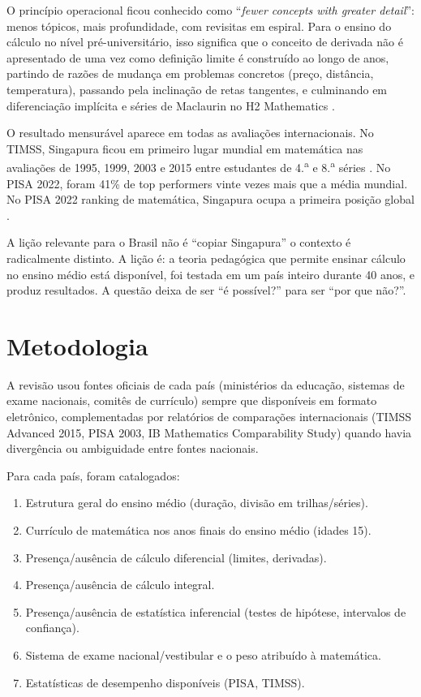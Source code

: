 \documentclass[12pt,a4paper,oneside]{article}
\begin{document}
O princípio operacional ficou conhecido como ``\emph{fewer concepts
with greater detail}'': menos tópicos, mais profundidade, com
revisitas em espiral. Para o ensino do cálculo no nível
pré-universitário, isso significa que o conceito de derivada não é
apresentado de uma vez como definição limite \textemdash{} é
construído ao longo de anos, partindo de razões de mudança em
problemas concretos (preço, distância, temperatura), passando pela
inclinação de retas tangentes, e culminando em diferenciação
implícita e séries de Maclaurin no H2 Mathematics
\cite{ref:seab-9758}.

O resultado mensurável aparece em todas as avaliações
internacionais. No TIMSS, Singapura ficou em primeiro lugar mundial
em matemática nas avaliações de 1995, 1999, 2003 e 2015 entre
estudantes de 4.\textsuperscript{a} e 8.\textsuperscript{a} séries
\cite{ref:singapore-math-wiki}. No PISA 2022, foram 41\% de top
performers \textemdash{} vinte vezes mais que a média mundial. No
PISA 2022 ranking de matemática, Singapura ocupa a primeira posição
global \cite{ref:pisa-2022-vol1}.

A lição relevante para o Brasil não é ``copiar Singapura''
\textemdash{} o contexto é radicalmente distinto. A lição é: a
teoria pedagógica que permite ensinar cálculo no ensino médio está
disponível, foi testada em um país inteiro durante 40 anos, e
produz resultados. A questão deixa de ser ``é possível?'' para ser
``por que não?''.

\section{Metodologia}

A revisão usou fontes oficiais de cada país (ministérios da
educação, sistemas de exame nacionais, comitês de currículo) sempre
que disponíveis em formato eletrônico, complementadas por relatórios
de comparações internacionais (TIMSS Advanced 2015, PISA
2003, IB Mathematics Comparability Study) quando
havia divergência ou ambiguidade entre fontes nacionais.

Para cada país, foram catalogados:

\begin{enumerate}
\item Estrutura geral do ensino médio (duração, divisão em
trilhas/séries).
\item Currículo de matemática nos anos finais do ensino médio
(idades 15).
\item Presença/ausência de cálculo diferencial (limites, derivadas).
\item Presença/ausência de cálculo integral.
\item Presença/ausência de estatística inferencial (testes de
hipótese, intervalos de confiança).
\item Sistema de exame nacional/vestibular e o peso atribuído à
matemática.
\item Estatísticas de desempenho disponíveis (PISA, TIMSS).
\end{enumerate}
\end{document}
